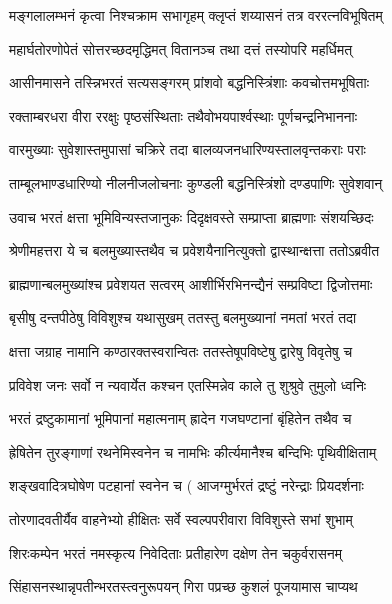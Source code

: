 \twolineshloka
{मङ्गलालम्भनं कृत्वा निश्चक्राम सभागृहम्}
{क्लृप्तं शय्यासनं तत्र वररत्नविभूषितम्}%

\twolineshloka
{महार्घतोरणोपेतं सोत्तरच्छदमृद्धिमत्}
{वितानञ्च तथा दत्तं तस्योपरि महर्धिमत्}%

\twolineshloka
{आसीनमासने तस्न्निभरतं सत्यसङ्गरम्}
{प्रांशवो बद्धनिस्त्रिंशाः कवचोत्तमभूषिताः}%

\twolineshloka
{रक्ताम्बरधरा वीरा ररक्षुः पृष्ठसंस्थिताः}
{तथैवोभयपार्श्वस्थाः पूर्णचन्द्रनिभाननाः}%

\twolineshloka
{वारमुख्याः सुवेशास्तमुपासां चक्रिरे तदा}
{बालव्यजनधारिण्यस्तालवृन्तकराः पराः}%

\twolineshloka
{ताम्बूलभाण्डधारिण्यो नीलनीजलोचनाः}
{कुण्डली बद्धनिस्त्रिंशो दण्डपाणिः सुवेशवान्} %

\twolineshloka
{उवाच भरतं क्षत्ता भूमिविन्यस्तजानुकः}
{दिदृक्षवस्ते सम्प्राप्ता ब्राह्मणाः संशयच्छिदः}%

\twolineshloka
{श्रेणीमहत्तरा ये च बलमुख्यास्तथैव च}
{प्रवेशयैनानित्युक्तो द्वास्थान्क्षत्ता ततोऽब्रवीत}%

\twolineshloka
{ब्राह्मणान्बलमुख्यांश्च प्रवेशयत सत्वरम्}
{आशीर्भिरभिनन्द्यैनं सम्प्रविष्टा द्विजोत्तमाः}%

\twolineshloka
{बृसीषु दन्तपीठेषु विविशुश्च यथासुखम्}
{ततस्तु बलमुख्यानां नमतां भरतं तदा}%

\twolineshloka
{क्षत्ता जग्राह नामानि कण्ठारक्तस्वरान्वितः}
{ततस्तेषूपविष्टेषु द्वारेषु विवृतेषु च}%

\twolineshloka
{प्रविवेश जनः सर्वो न न्यवार्येत कश्चन}
{एतस्मिन्नेव काले तु शुश्रुवे तुमुलो ध्वनिः}%

\twolineshloka
{भरतं द्रष्टुकामानां भूमिपानां महात्मनाम्}
{ह्रादेन गजघण्टानां बृंहितेन तथैव च}%

\twolineshloka
{ह्रेषितेन तुरङ्गाणां रथनेमिस्वनेन च}
{नामभिः कीर्त्यमानैश्च बन्दिभिः पृथिवीक्षिताम्}%

\twolineshloka
{शङ्खवादित्रघोषेण पटहानां स्वनेन च}
{( आजग्मुर्भरतं द्रष्टुं नरेन्द्राः प्रियदर्शनाः}%

\twolineshloka
{तोरणादवतीर्यैव वाहनेभ्यो हीक्षितः}
{सर्वे स्वल्पपरीवारा विविशुस्ते सभां शुभाम्} %

\twolineshloka
{शिरःकम्पेन भरतं नमस्कृत्य निवेदिताः}
{प्रतीहारेण दक्षेण तेन चकुर्वरासनम्}%

\twolineshloka
{सिंहासनस्थान्नृपतीन्भरतस्त्वनुरूपयन्}
{गिरा पप्रच्छ कुशलं पूजयामास चाप्यथ}%

